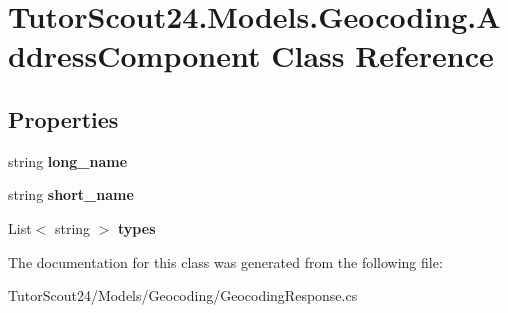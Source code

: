 \hypertarget{class_tutor_scout24_1_1_models_1_1_geocoding_1_1_address_component}{}\section{Tutor\+Scout24.\+Models.\+Geocoding.\+Address\+Component Class Reference}
\label{class_tutor_scout24_1_1_models_1_1_geocoding_1_1_address_component}
\subsection*{Properties}
\begin{DoxyCompactItemize}
\item 
\mbox{\label{class_tutor_scout24_1_1_models_1_1_geocoding_1_1_address_component_a0f9b44f75496b97a5041cca1ebf6392a}} 
string {\bfseries long\+\_\+name}
\item 
\mbox{\label{class_tutor_scout24_1_1_models_1_1_geocoding_1_1_address_component_a2909748ce30d23014f27f8445507036b}} 
string {\bfseries short\+\_\+name}
\item 
\mbox{\label{class_tutor_scout24_1_1_models_1_1_geocoding_1_1_address_component_af8b49769a18160a3d3c7ad248d28d243}} 
List$<$ string $>$ {\bfseries types}
\end{DoxyCompactItemize}


The documentation for this class was generated from the following file\+:\begin{DoxyCompactItemize}
\item 
Tutor\+Scout24/\+Models/\+Geocoding/Geocoding\+Response.\+cs\end{DoxyCompactItemize}
